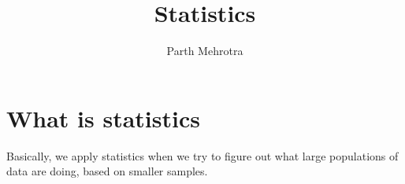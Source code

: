 \documentclass{article}
\title{Statistics}
\author{Parth Mehrotra}
\begin{document}
	\maketitle
	\newpage

	\section{What is statistics} 
	Basically, we apply statistics when we try to figure out what large populations of data are doing, based on smaller samples.
\end{document}

